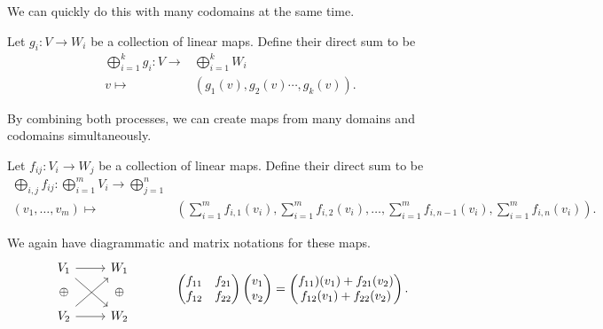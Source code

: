 We can quickly do this with many codomains at the same time.
\begin{definition}
Let $g_i: V\to W_i$ be a collection of linear maps. Define their direct sum to be 
\begin{align*}
\bigoplus_{i=1}^k g_i: V\to& \bigoplus_{i=1}^k W_i\\
v\mapsto &(g_1(v), g_2(v) \cdots , g_k(v)).
\end{align*}
\end{definition}
By combining both processes, we can create maps from many domains and codomains simultaneously. 
\begin{definition}
Let $f_{ij}: V_i\to W_j$ be a collection of linear maps. Define their direct sum to be 
\begin{align*}
\bigoplus_{i,j} f_{ij}: \bigoplus_{i=1}^m V_i\to\bigoplus_{j=1}^n\\
(v_1, \ldots, v_m)\mapsto & \left(\sum_{i=1}^mf_{i,1}(v_i), \sum_{i=1}^mf_{i,2}(v_i), \ldots, \sum_{i=1}^mf_{i,{n-1}}(v_i), \sum_{i=1}^mf_{i,{n}}(v_i)\right).
\end{align*}
\end{definition}
We again have diagrammatic and matrix notations for these maps. 
\[
\begin{tikzcd}[row sep= tiny]
V_1\arrow{r} \arrow{rdd}  & W_1\\
\oplus & \oplus \\
V_2\arrow{r}  \arrow{ruu} & W_2
\end{tikzcd}\;\;\;\;\;\;\;\;\;\;\;\;
\begin{pmatrix}
f_{11}& f_{21}\\f_{12} & f_{22}
\end{pmatrix}
\begin{pmatrix} v_1 \\ v_2\end{pmatrix} = \begin{pmatrix} f_{11})(v_1)+f_{21}(v_2)\\ f_{12}(v_1)+f_{22}(v_2)\end{pmatrix}.
\]


